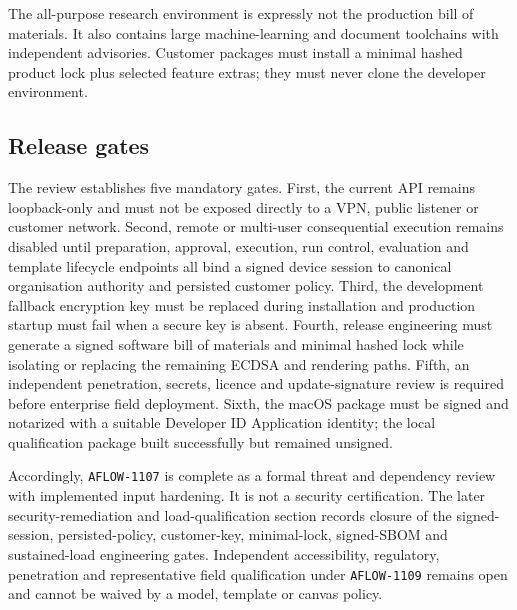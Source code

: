 The all-purpose research environment is expressly not the production bill of materials. It also
contains large machine-learning and document toolchains with independent advisories. Customer
packages must install a minimal hashed product lock plus selected feature extras; they must never
clone the developer environment.

\subsection{Release gates}

The review establishes five mandatory gates. First, the current API remains loopback-only and must
not be exposed directly to a VPN, public listener or customer network. Second, remote or multi-user
consequential execution remains disabled until preparation, approval, execution, run control,
evaluation and template lifecycle endpoints all bind a signed device session to canonical
organisation authority and persisted customer policy. Third, the development fallback encryption
key must be replaced during installation and production startup must fail when a secure key is
absent. Fourth, release engineering must generate a signed software bill of materials and minimal
hashed lock while isolating or replacing the remaining ECDSA and rendering paths. Fifth, an
independent penetration, secrets, licence and update-signature review is required before enterprise
field deployment. Sixth, the macOS package must be signed and notarized with a suitable Developer
ID Application identity; the local qualification package built successfully but remained unsigned.

Accordingly, \texttt{AFLOW-1107} is complete as a formal threat and dependency review with
implemented input hardening. It is not a security certification. The later security-remediation and
load-qualification section records closure of the signed-session, persisted-policy, customer-key,
minimal-lock, signed-SBOM and sustained-load engineering gates. Independent accessibility,
regulatory, penetration and representative field qualification under \texttt{AFLOW-1109} remains
open and cannot be waived by a model, template or canvas policy.
